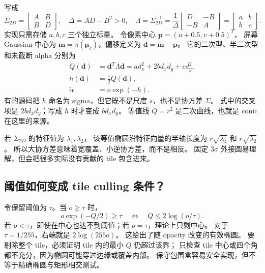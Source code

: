 写成
\begin{equation}
 \Sigma_{2D}=\begin{bmatrix}A&B\\B&D\end{bmatrix},\quad
 \Delta=AD-B^2>0,\quad
 \Lambda=\Sigma_{2D}^{-1}
 =\frac{1}{\Delta}\begin{bmatrix}D&-B\\-B&A\end{bmatrix}
 =\begin{bmatrix}a&b\\b&c\end{bmatrix}.
\end{equation}
实现只需存储 $a,b,c$ 三个独立标量。
令像素中心 $\mathbf p=(u+0.5,v+0.5)^T$，
屏幕 Gaussian 中心为 $\mathbf m=\pi(\boldsymbol\mu_c)$，偏移定义为
$\mathbf d=\mathbf m-\mathbf p$。
它的二次型、半二次型和未截断 alpha 分别为
\begin{align}
 Q(\mathbf d)&=\mathbf d^T\Lambda\mathbf d
             =a d_x^2+2b d_xd_y+c d_y^2,\\
 h(\mathbf d)&=\tfrac12Q(\mathbf d),\\
 \widetilde\alpha&=o\exp(-h).
\end{align}
有的源码把 $h$ 命名为 sigma，但它既不是尺度 $s$，也不是协方差 $\Sigma$。
式中的交叉项是 $2b d_xd_y$；写成 $h$ 时才变成 $b d_xd_y$。
等值线 $Q=r^2$ 是二次曲线，也就是 conic 在这里的来源。

若 $\Sigma_{2D}$ 的特征值为 $\lambda_1,\lambda_2$，
该等值椭圆沿特征向量的半轴长度为 $r\sqrt{\lambda_1}$ 和 $r\sqrt{\lambda_2}$。
所以大协方差意味着宽覆盖、小逆协方差，而不是相反。
固定 $3\sigma$ 外接圆易理解，但会把很多实际没有贡献的 tile 包含进来。

\subsection{阈值如何变成 tile culling 条件？}

令保留阈值为 $\tau$。当 $o\geq\tau$ 时，
\begin{equation}
 o\exp(-Q/2)\geq\tau
 \quad\Longleftrightarrow\quad
 Q\leq2\log(o/\tau).
\end{equation}
若 $o<\tau$，即使在中心也达不到阈值；若 $o=\tau$，理论上只剩中心。
对于 $\tau=1/255$，右端就是 $2\log(255o)$。
这给出了随 opacity 改变的有效椭圆。
要剔除整个 tile，必须证明 tile 内的最小 $Q$ 仍超过该界；
只检查 tile 中心或四个角都不充分，因为椭圆可能穿过边缘或覆盖内部。
保守包围盒容易安全实现，但不等于精确椭圆与矩形相交测试。

